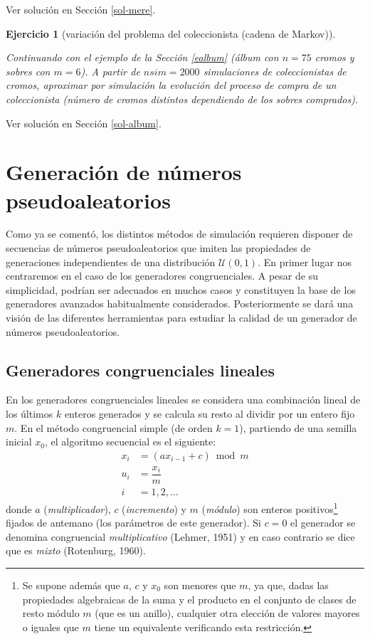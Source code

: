 \documentclass[
]{book}
\theoremstyle{break}
\newtheorem{exercise}{Ejercicio}[chapter]
\theoremstyle{nonumberplain}
\begin{document}
Ver solución en Sección \ref{sol-mere}.

\begin{exercise}[variación del problema del coleccionista (cadena de Markov)]
\protect\hypertarget{exr:album}{}\label{exr:album}

Continuando con el ejemplo de la Sección \ref{ealbum}
(álbum con \(n = 75\) cromos y sobres con \(m = 6\)). A partir de \(nsim=2000\) simulaciones de coleccionistas de cromos, aproximar por simulación la evolución del proceso de compra de un coleccionista (número de cromos distintos dependiendo de los sobres comprados).
\end{exercise}

Ver solución en Sección \ref{sol-album}.

\hypertarget{gen-pseudo}{%
\chapter{Generación de números pseudoaleatorios}\label{gen-pseudo}}

Como ya se comentó, los distintos métodos de simulación requieren disponer de secuencias de números pseudoaleatorios que imiten las propiedades de generaciones independientes de una distribución \(\mathcal{U}(0,1)\).
En primer lugar nos centraremos en el caso de los generadores congruenciales. A pesar de su simplicidad, podrían ser adecuados en muchos casos y constituyen la base de los generadores avanzados habitualmente considerados.
Posteriormente se dará una visión de las diferentes herramientas para estudiar la calidad de un generador de números pseudoaleatorios.

\hypertarget{gen-cong}{%
\section{Generadores congruenciales lineales}\label{gen-cong}}

En los generadores congruenciales lineales se considera una combinación lineal de los últimos \(k\) enteros generados y se calcula su resto al dividir por un entero fijo \(m\).
En el método congruencial simple (de orden \(k = 1\)), partiendo de una semilla inicial \(x_0\), el algoritmo secuencial es el siguiente:
\[\begin{aligned}
x_{i}  & = (ax_{i-1}+c) \bmod m \\
u_{i}  & = \dfrac{x_{i}}{m} \\
i  & =1,2,\ldots
\end{aligned}\]
donde \(a\) (\emph{multiplicador}), \(c\) (\emph{incremento}) y \(m\) (\emph{módulo}) son enteros positivos\footnote{Se supone además que \(a\), \(c\) y \(x_0\) son menores que \(m\), ya que, dadas las propiedades algebraicas de la suma y el producto en el conjunto de clases de resto módulo \(m\) (que es un anillo), cualquier otra elección de valores mayores o iguales que \(m\) tiene un equivalente verificando esta restricción.} fijados de antemano (los parámetros de este generador). Si \(c=0\) el generador se denomina congruencial \emph{multiplicativo} (Lehmer, 1951) y en caso contrario se dice que es \emph{mixto} (Rotenburg, 1960).
\end{document}
